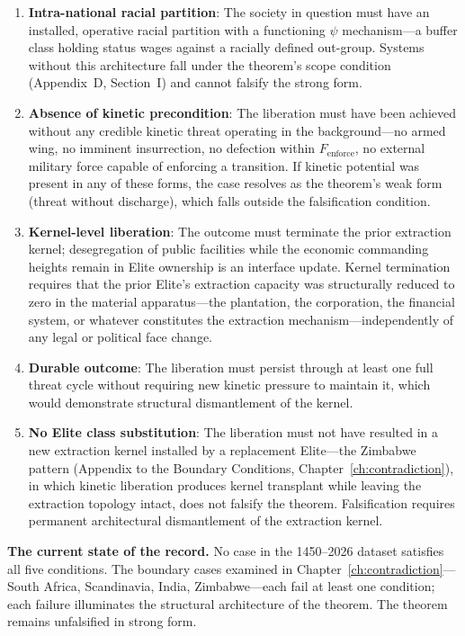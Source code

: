 \begin{enumerate}
    \item \textbf{Intra-national racial partition}: The society in question must have an installed, operative racial partition with a functioning $\psi$ mechanism---a buffer class holding status wages against a racially defined out-group. Systems without this architecture fall under the theorem's scope condition (Appendix~D, Section~I) and cannot falsify the strong form.

    \item \textbf{Absence of kinetic precondition}: The liberation must have been achieved without any credible kinetic threat operating in the background---no armed wing, no imminent insurrection, no defection within $F_{\text{enforce}}$, no external military force capable of enforcing a transition. If kinetic potential was present in any of these forms, the case resolves as the theorem's weak form (threat without discharge), which falls outside the falsification condition.

    \item \textbf{Kernel-level liberation}: The outcome must terminate the prior extraction kernel; desegregation of public facilities while the economic commanding heights remain in Elite ownership is an interface update. Kernel termination requires that the prior Elite's extraction capacity was structurally reduced to zero in the material apparatus---the plantation, the corporation, the financial system, or whatever constitutes the extraction mechanism---independently of any legal or political face change.

    \item \textbf{Durable outcome}: The liberation must persist through at least one full threat cycle without requiring new kinetic pressure to maintain it, which would demonstrate structural dismantlement of the kernel.

    \item \textbf{No Elite class substitution}: The liberation must not have resulted in a new extraction kernel installed by a replacement Elite---the Zimbabwe pattern (Appendix to the Boundary Conditions, Chapter~\ref{ch:contradiction}), in which kinetic liberation produces kernel transplant while leaving the extraction topology intact, does not falsify the theorem. Falsification requires permanent architectural dismantlement of the extraction kernel.
\end{enumerate}

\textbf{The current state of the record.} No case in the 1450--2026 dataset satisfies all five conditions. The boundary cases examined in Chapter~\ref{ch:contradiction}---South Africa, Scandinavia, India, Zimbabwe---each fail at least one condition; each failure illuminates the structural architecture of the theorem. The theorem remains unfalsified in strong form.

